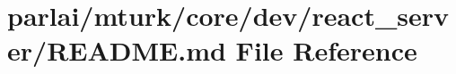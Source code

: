 \hypertarget{parlai_2mturk_2core_2dev_2react__server_2README_8md}{}\section{parlai/mturk/core/dev/react\+\_\+server/\+R\+E\+A\+D\+ME.md File Reference}
\label{parlai_2mturk_2core_2dev_2react__server_2README_8md}
